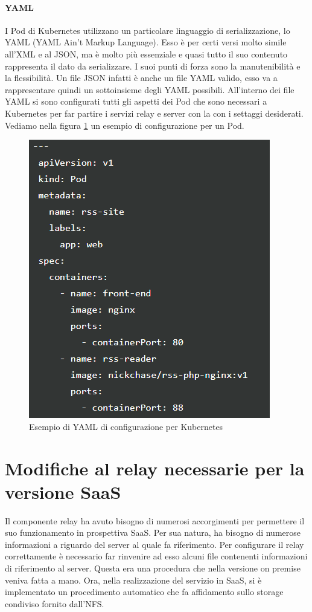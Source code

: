 \paragraph{YAML} 
I Pod di Kubernetes utilizzano un particolare linguaggio di serializzazione, lo YAML (YAML Ain't Markup Language). Esso è per certi versi molto simile all'XML e al JSON, ma è molto più essenziale e quasi tutto il suo contenuto rappresenta il dato da serializzare. I suoi punti di forza sono la manutenibilità e la flessibilità. Un file JSON infatti è anche un file YAML valido, esso va a rappresentare quindi un sottoinsieme degli YAML possibili. All'interno dei file YAML si sono configurati tutti gli aspetti dei Pod che sono necessari a Kubernetes per far partire i servizi relay e server con la con i settaggi desiderati. Vediamo nella figura \ref{fig:yaml} un esempio di configurazione per un Pod.
\begin{figure}
	\centering
	\includegraphics[width=0.5\linewidth]{capitoli/imgs/yaml}
	\caption{Esempio di YAML di configurazione per Kubernetes}
	\label{fig:yaml}
\end{figure}


\section{Modifiche al relay necessarie per la versione SaaS}
Il componente relay ha avuto bisogno di numerosi accorgimenti per permettere il suo funzionamento in prospettiva SaaS. Per sua natura, ha bisogno di numerose informazioni a riguardo del server al quale fa riferimento. Per configurare il relay correttamente è necessario far rinvenire ad esso alcuni file contenenti informazioni di riferimento al server. Questa era una procedura che nella versione on premise veniva fatta a mano. Ora, nella realizzazione del servizio in SaaS, si è implementato un procedimento automatico che fa affidamento sullo storage condiviso fornito dall'NFS.
